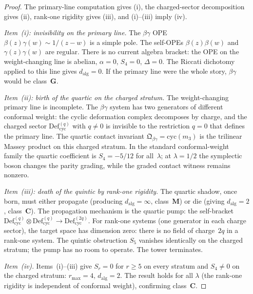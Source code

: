 \documentclass[11pt]{article}
\theoremstyle{plain}
\theoremstyle{definition}
\theoremstyle{remark}
\begin{document}
\begin{proof}
The primary-line computation gives (i), the charged-sector
decomposition gives (ii), rank-one rigidity gives (iii), and
(i)--(iii) imply (iv).

\emph{Item~(i): invisibility on the primary line.}
The $\beta\gamma$ OPE
$\beta(z)\gamma(w) \sim 1/(z{-}w)$ is a simple pole.
The self-OPEs $\beta(z)\beta(w)$ and $\gamma(z)\gamma(w)$
are regular. There is no current algebra bracket: the OPE on
the weight-changing line is abelian, $\alpha = 0$, $S_4 = 0$,
$\Delta = 0$. The Riccati dichotomy applied to this line
gives $d_{\mathrm{alg}} = 0$. If the primary line were the
whole story, $\beta\gamma$ would be class~$\mathbf{G}$.

\emph{Item~(ii): birth of the quartic on the charged stratum.}
The weight-changing primary line is incomplete. The $\beta\gamma$
system has two generators of different conformal weight: the
cyclic deformation complex decomposes by charge, and the charged
sector $\mathrm{Def}_{\mathrm{cyc}}^{(q)}$ with $q \neq 0$ is
invisible to the restriction $q = 0$ that defines the primary
line. The quartic contact invariant
$\mathfrak{Q}_{\beta\gamma} = \mathrm{cyc}(m_3)$ is the
trilinear Massey product on this charged stratum. In the standard
conformal-weight family the quartic coefficient is
$S_4=-5/12$ for all~$\lambda$; at $\lambda=1/2$ the symplectic
boson changes the parity grading, while the graded contact witness
remains nonzero.

\emph{Item~(iii): death of the quintic by rank-one rigidity.}
The quartic shadow, once born, must either propagate (producing
$d_{\mathrm{alg}} = \infty$, class~$\mathbf{M}$) or die (giving
$d_{\mathrm{alg}} = 2$, class~$\mathbf{C}$). The propagation
mechanism is the quartic pump: the self-bracket
$\mathrm{Def}_{\mathrm{cyc}}^{(q)} \otimes
\mathrm{Def}_{\mathrm{cyc}}^{(q)} \to
\mathrm{Def}_{\mathrm{cyc}}^{(2q)}$.
For rank-one systems (one generator in each charge sector), the
target space has dimension zero: there is no field of charge~$2q$
in a rank-one system. The quintic obstruction $S_5$ vanishes
identically on the charged stratum; the pump has no room to
operate. The tower terminates.

\emph{Item~(iv).}
Items~(i)--(iii) give $S_r = 0$ for $r \geq 5$ on every stratum
and $S_4 \neq 0$ on the charged stratum: $r_{\max} = 4$,
$d_{\mathrm{alg}} = 2$. The result holds for all $\lambda$ (the
rank-one rigidity is independent of conformal weight), confirming
class~$\mathbf{C}$.
\end{proof}
\end{document}
